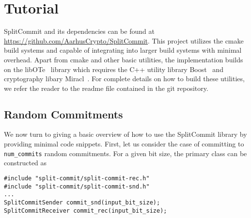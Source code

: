 
\section{Tutorial}
SplitCommit and its dependencies can be found at \url{https://github.com/AarhusCrypto/SplitCommit}. This project utilizes the cmake build systems and capable of integrating into larger build systems with minimal overhead. Apart from cmake and other basic utilities, the implementation builds on the libOTe~\cite{libOTe} library which requires the C++ utility library Boost~\cite{boost} and cryptography libary Miracl~\cite{miracl}. For complete details on how to build these utilities, we refer the reader to the readme file contained in the git repository.



%
%
%
%
%
%

\subsection{Random Commitments}
We now turn to giving a basic overview of how to use the SplitCommit library by providing minimal code snippets. First, let us consider the case of committing to \texttt{num\_commits} random commitments. For a given bit size, the primary class can be constructed as
\begin{lstlisting}
#include "split-commit/split-commit-rec.h"
#include "split-commit/split-commit-snd.h"
...
SplitCommitSender commit_snd(input_bit_size);
SplitCommitReceiver commit_rec(input_bit_size);
\end{lstlisting}

